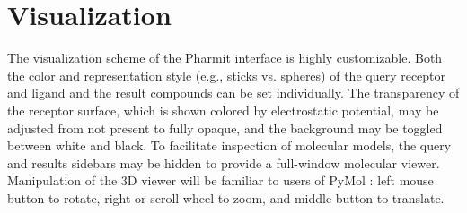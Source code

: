 \section{Visualization}

The visualization scheme of the Pharmit interface is highly customizable.  Both the color and representation style (e.g., sticks vs. spheres) of the query receptor and ligand and the result compounds can be set individually.  The transparency of the receptor surface, which is shown colored by electrostatic potential, may be adjusted from not present to fully opaque, and the background may be toggled between white and black.  To facilitate inspection of molecular models, the query and results sidebars may be hidden to provide a full-window molecular viewer. Manipulation of the 3D viewer will be familiar to users of PyMol \cite{PyMOL}: left mouse button to rotate, right or scroll wheel to zoom, and middle button to translate.  